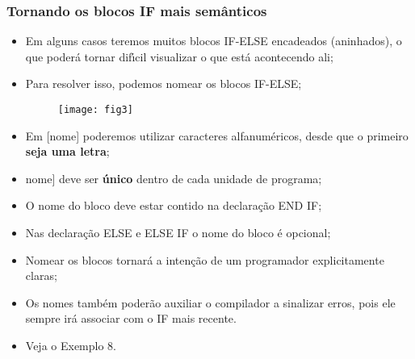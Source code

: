 \documentclass[xcolor=table]{beamer}
\newenvironment{stepitemize}{\begin{itemize}[<+->]}{\end{itemize} }
\begin{document}
\begin{frame}%

\frametitle{Tornando os blocos IF mais sem\^{a}nticos}

\begin{stepitemize}
\item Em alguns casos teremos muitos blocos IF-ELSE encadeados (aninhados),
o que poder\'{a} tornar dif\'{\i}cil visualizar o que est\'{a} acontecendo
ali;

\item Para resolver isso, podemos nomear os blocos IF-ELSE;

\begin{figure}
	\texttt{[image: fig3]}
\end{figure}
\end{stepitemize}

\transboxout%
\end{frame}%

\begin{frame}
\begin{stepitemize}
	\item Em [nome] poderemos utilizar caracteres alfanum\'{e}ricos, desde que o
	primeiro \textbf{seja uma letra};
	
	\item \lbrack nome] deve ser \textbf{\'{u}nico} dentro de cada unidade de
	programa;
	
	\item O nome do bloco deve estar contido na declara\c{c}\~{a}o END IF;
	
	\item Nas declara\c{c}\~{a}o ELSE e ELSE IF o nome do bloco \'{e} opcional;
	
	\item Nomear os blocos tornar\'{a} a inten\c{c}\~{a}o de um programador
	explicitamente claras;
	
	\item Os nomes tamb\'{e}m poder\~{a}o auxiliar o compilador a sinalizar
	erros, pois ele sempre ir\'{a} associar com o IF mais recente.
	
	\item Veja o Exemplo 8.
\end{stepitemize}
\end{frame}
\end{document}
